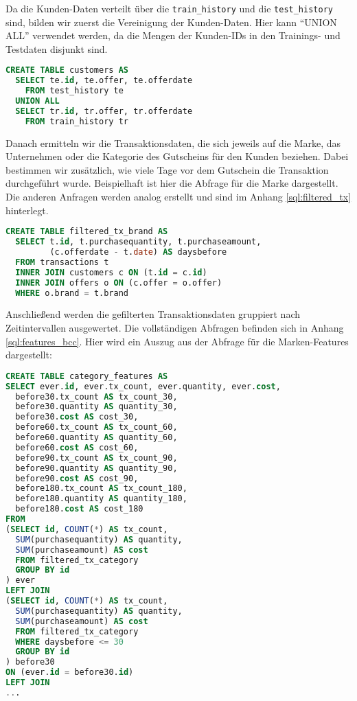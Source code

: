 Da die Kunden-Daten verteilt über die \texttt{train\_history} und die \texttt{test\_history} sind, 
bilden wir zuerst die Vereinigung der Kunden-Daten. Hier kann "`UNION ALL"' verwendet werden, da die 
Mengen der Kunden-IDs in den Trainings- und Testdaten disjunkt sind.

\begin{lstlisting}[language=SQL]
CREATE TABLE customers AS 
  SELECT te.id, te.offer, te.offerdate
    FROM test_history te
  UNION ALL
  SELECT tr.id, tr.offer, tr.offerdate
    FROM train_history tr 
\end{lstlisting}

Danach ermitteln wir die Transaktionsdaten, die sich jeweils auf die Marke, das Unternehmen oder 
die Kategorie des Gutscheins für den Kunden beziehen. Dabei bestimmen wir zusätzlich, wie viele
Tage vor dem Gutschein die Transaktion durchgeführt wurde. Beispielhaft ist hier die Abfrage
für die Marke dargestellt. Die anderen Anfragen werden analog erstellt und sind im Anhang
\ref{sql:filtered_tx} hinterlegt.
\begin{lstlisting}[language=SQL]
CREATE TABLE filtered_tx_brand AS
  SELECT t.id, t.purchasequantity, t.purchaseamount, 
         (c.offerdate - t.date) AS daysbefore 
  FROM transactions t 
  INNER JOIN customers c ON (t.id = c.id)
  INNER JOIN offers o ON (c.offer = o.offer)
  WHERE o.brand = t.brand
\end{lstlisting}

Anschließend werden die gefilterten Transaktionsdaten gruppiert nach
Zeitintervallen ausgewertet. Die vollständigen Abfragen befinden sich
in Anhang \ref{sql:features_bcc}. Hier wird ein Auszug aus der
Abfrage für die Marken-Features dargestellt:
\begin{lstlisting}[language=SQL]
CREATE TABLE category_features AS
SELECT ever.id, ever.tx_count, ever.quantity, ever.cost,
  before30.tx_count AS tx_count_30,
  before30.quantity AS quantity_30,
  before30.cost AS cost_30,
  before60.tx_count AS tx_count_60,
  before60.quantity AS quantity_60,
  before60.cost AS cost_60,
  before90.tx_count AS tx_count_90,
  before90.quantity AS quantity_90,
  before90.cost AS cost_90,
  before180.tx_count AS tx_count_180,
  before180.quantity AS quantity_180,
  before180.cost AS cost_180
FROM 
(SELECT id, COUNT(*) AS tx_count, 
  SUM(purchasequantity) AS quantity, 
  SUM(purchaseamount) AS cost
  FROM filtered_tx_category
  GROUP BY id
) ever
LEFT JOIN
(SELECT id, COUNT(*) AS tx_count, 
  SUM(purchasequantity) AS quantity, 
  SUM(purchaseamount) AS cost
  FROM filtered_tx_category
  WHERE daysbefore <= 30
  GROUP BY id
) before30
ON (ever.id = before30.id)
LEFT JOIN
...
\end{lstlisting}

